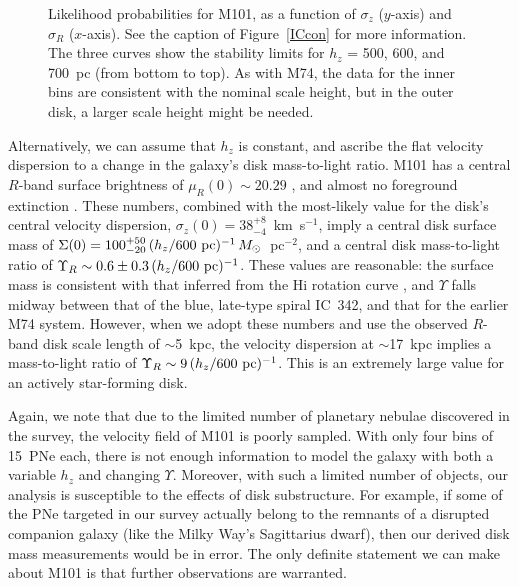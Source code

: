 \documentclass[12pt,preprint]{emulateapj}
\newcommand{\kms}{km~s$^{-1}$}
\begin{document}
\begin{figure}[b]
\caption{\scriptsize Likelihood probabilities for M101, as a function of $\sigma_z$ ($y$-axis) and $\sigma_R$ ($x$-axis).  See the caption of Figure~\ref{ICcon} for more information.  The three curves show the stability limits for $h_z$ = 500, 600, and 700~pc (from bottom to top).  As with M74, the data for the inner bins are consistent with the nominal scale height, but in the outer disk, a larger scale height might be needed. \label{M101con} }
\end{figure}

Alternatively, we can assume that $h_z$ is constant, and ascribe the flat velocity dispersion to a change in the galaxy's disk mass-to-light ratio.  M101 has a central $R$-band surface brightness of $\mu_R(0) \sim 20.29$ \citep{k+00}, and almost no foreground extinction \citep[$E(B-V) = 0.009$;][]{sfd98}.  These numbers, combined with the most-likely value for the disk's central velocity dispersion, $\sigma_z(0) = 38^{+8}_{-4}$~\kms, imply a central disk surface mass of $\Sigma(0) = 100^{+50}_{-20} \, (h_z / 600~{\rm pc})^{-1} \, M_{\odot}$~pc$^{-2}$, and a central disk mass-to-light ratio of $\Upsilon_R \sim 0.6 \pm 0.3 \, (h_z / 600~{\rm pc})^{-1}$.  These values are reasonable:  the surface mass is consistent with that inferred from the H{\sc i} rotation curve \citep{THINGS}, and $\Upsilon$ falls midway between that of the blue, late-type spiral IC~342, and that for the earlier M74 system.  However, when we adopt these numbers and use the observed $R$-band disk scale length of $\sim$5~kpc, the velocity dispersion at $\sim$17~kpc implies a mass-to-light ratio of $\Upsilon_R \sim 9 \, (h_z / 600~{\rm pc})^{-1}$.  This is an extremely large value for an actively star-forming disk.

Again, we note that due to the limited number of planetary nebulae discovered in the \citet{M101PNe} survey, the velocity field of M101 is poorly sampled.  With only four bins of 15~PNe each, there is not enough information to model the galaxy with both a variable $h_z$ and changing $\Upsilon$.  Moreover, with such a limited number of objects, our analysis is susceptible to the effects of disk substructure.  For example, if some of the PNe targeted in our survey actually belong to the remnants of a disrupted companion galaxy (like the Milky Way's Sagittarius dwarf), then our derived disk mass measurements would be in error.  The only definite statement we can make about M101 is that further observations are warranted.
\end{document}
